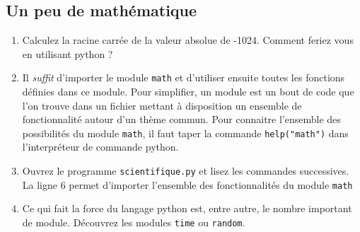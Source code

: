 \subsection{Un peu de mathématique}

\begin{enumerate}
\item Calculez la racine carrée de la valeur absolue de -1024.
  Comment feriez vous en utilisant python ?

\item Il \textit{suffit} d'importer le module \texttt{math} et d'utiliser ensuite
  toutes les fonctions définies dans ce module.
  Pour simplifier, un module est un bout de code que l'on trouve dans un fichier
  mettant à disposition un ensemble de fonctionnalité autour d'un thème commun.
  Pour connaitre l'ensemble des possibilités du module \texttt{math}, il faut taper la commande
  \texttt{help("math")} dans l'interpréteur de commande python.


\item Ouvrez le programme \texttt{scientifique.py} et lisez les commandes successives.
  La ligne 6 permet d'importer l'ensemble des fonctionnalités du module \texttt{math}

\item Ce qui fait la force du langage python est, entre autre, le nombre important de module.
  Découvrez les modules \texttt{time} ou \texttt{random}.


\end{enumerate}
